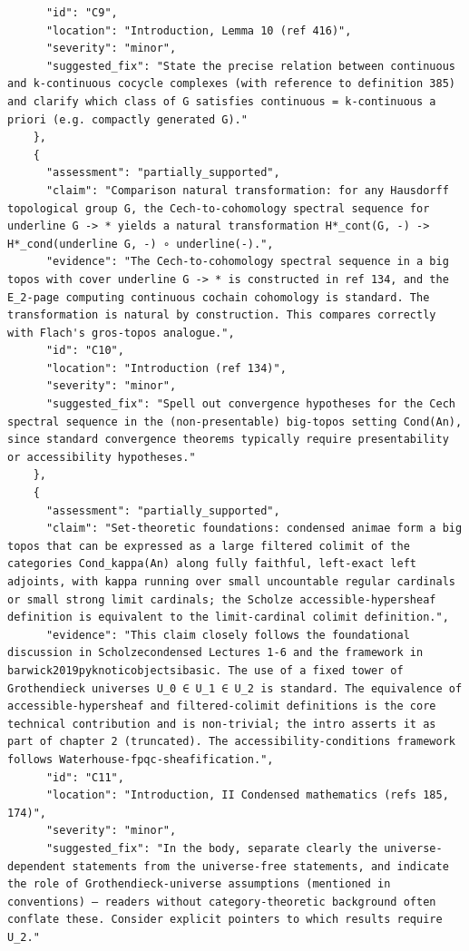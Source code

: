\documentclass[11pt]{article}
\begin{document}
\begin{verbatim}
      "id": "C9",
      "location": "Introduction, Lemma 10 (ref 416)",
      "severity": "minor",
      "suggested_fix": "State the precise relation between continuous and k-continuous cocycle complexes (with reference to definition 385) and clarify which class of G satisfies continuous = k-continuous a priori (e.g. compactly generated G)."
    },
    {
      "assessment": "partially_supported",
      "claim": "Comparison natural transformation: for any Hausdorff topological group G, the Cech-to-cohomology spectral sequence for underline G -> * yields a natural transformation H*_cont(G, -) -> H*_cond(underline G, -) ∘ underline(-).",
      "evidence": "The Cech-to-cohomology spectral sequence in a big topos with cover underline G -> * is constructed in ref 134, and the E_2-page computing continuous cochain cohomology is standard. The transformation is natural by construction. This compares correctly with Flach's gros-topos analogue.",
      "id": "C10",
      "location": "Introduction (ref 134)",
      "severity": "minor",
      "suggested_fix": "Spell out convergence hypotheses for the Cech spectral sequence in the (non-presentable) big-topos setting Cond(An), since standard convergence theorems typically require presentability or accessibility hypotheses."
    },
    {
      "assessment": "partially_supported",
      "claim": "Set-theoretic foundations: condensed animae form a big topos that can be expressed as a large filtered colimit of the categories Cond_kappa(An) along fully faithful, left-exact left adjoints, with kappa running over small uncountable regular cardinals or small strong limit cardinals; the Scholze accessible-hypersheaf definition is equivalent to the limit-cardinal colimit definition.",
      "evidence": "This claim closely follows the foundational discussion in Scholzecondensed Lectures 1-6 and the framework in barwick2019pyknoticobjectsibasic. The use of a fixed tower of Grothendieck universes U_0 ∈ U_1 ∈ U_2 is standard. The equivalence of accessible-hypersheaf and filtered-colimit definitions is the core technical contribution and is non-trivial; the intro asserts it as part of chapter 2 (truncated). The accessibility-conditions framework follows Waterhouse-fpqc-sheafification.",
      "id": "C11",
      "location": "Introduction, II Condensed mathematics (refs 185, 174)",
      "severity": "minor",
      "suggested_fix": "In the body, separate clearly the universe-dependent statements from the universe-free statements, and indicate the role of Grothendieck-universe assumptions (mentioned in conventions) — readers without category-theoretic background often conflate these. Consider explicit pointers to which results require U_2."

\end{verbatim}
\end{document}
